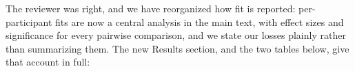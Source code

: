 The reviewer was right, and we have reorganized how fit is reported: per-participant fits are now a central analysis in the main text, with effect sizes and significance for every pairwise comparison, and we state our losses plainly rather than summarizing them. The new Results section, and the two tables below, give that account in full:

